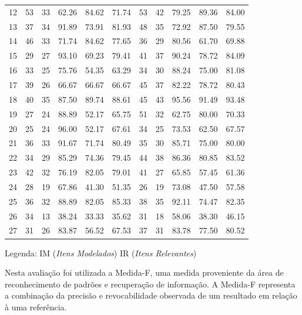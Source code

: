 \begin{landscape}
\begin{table}[!htb]
\begin{tabular}{l|cc|ccc|cc|ccc}
    12	&	53	&	33	&	62.26	&	84.62	&	71.74	&	53	&	42	&	79.25	&	89.36	&	84.00	\\
    13	&	37	&	34	&	91.89	&	73.91	&	81.93	&	48	&	35	&	72.92	&	87.50	&	79.55	\\
    14	&	46	&	33	&	71.74	&	84.62	&	77.65	&	36	&	29	&	80.56	&	61.70	&	69.88	\\
    15	&	29	&	27	&	93.10	&	69.23	&	79.41	&	41	&	37	&	90.24	&	78.72	&	84.09	\\
    16	&	33	&	25	&	75.76	&	54.35	&	63.29	&	34	&	30	&	88.24	&	75.00	&	81.08	\\
    17	&	39	&	26	&	66.67	&	66.67	&	66.67	&	45	&	37	&	82.22	&	78.72	&	80.43	\\
    18	&	40	&	35	&	87.50	&	89.74	&	88.61	&	45	&	43	&	95.56	&	91.49	&	93.48	\\
    19	&	27	&	24	&	88.89	&	52.17	&	65.75	&	51	&	32	&	62.75	&	80.00	&	70.33	\\
    20	&	25	&	24	&	96.00	&	52.17	&	67.61	&	34	&	25	&	73.53	&	62.50	&	67.57	\\
    21	&	36	&	33	&	91.67	&	71.74	&	80.49	&	35	&	30	&	85.71	&	75.00	&	80.00	\\
    22	&	34	&	29	&	85.29	&	74.36	&	79.45	&	44	&	38	&	86.36	&	80.85	&	83.52	\\
    23	&	42	&	32	&	76.19	&	82.05	&	79.01	&	41	&	27	&	65.85	&	57.45	&	61.36	\\
    24	&	28	&	19	&	67.86	&	41.30	&	51.35	&	26	&	19	&	73.08	&	47.50	&	57.58	\\
    25	&	36	&	32	&	88.89	&	82.05	&	85.33	&	38	&	35	&	92.11	&	74.47	&	82.35	\\
    26	&	34	&	13	&	38.24	&	33.33	&	35.62	&	31	&	18	&	58.06	&	38.30	&	46.15	\\
    27	&	31	&	26	&	83.87	&	56.52	&	67.53	&	37	&	31	&	83.78	&	77.50	&	80.52	\\
    \toprule
    \end{tabular}
    \begin{tablenotes}
    \tiny
    \item Legenda: IM (\textit{Itens Modelados}) IR (\textit{Itens Relevantes})
    \end{tablenotes}
\end{table}
\end{landscape}

Nesta avaliação foi utilizada a Medida-F, uma medida proveniente da área de reconhecimento de padrões e recuperação de informação. 
A Medida-F representa a combinação da precisão e revocabilidade observada de um resultado em relação à uma referência.

